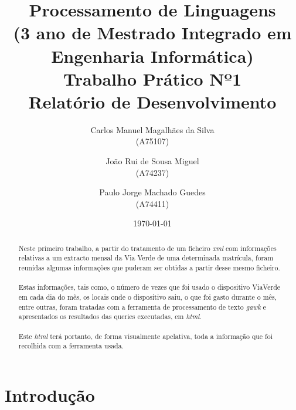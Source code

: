 \documentclass{report}
\title{Processamento de Linguagens\\(3 ano de Mestrado Integrado em Engenharia Informática)\\ \textbf{Trabalho Prático Nº1}\\ Relatório de Desenvolvimento}
\author{Carlos Manuel Magalhães da Silva\\ (A75107) \and
				João Rui de Sousa Miguel\\ (A74237) \and
				Paulo Jorge Machado Guedes\\ (A74411)}
\date{\today}
\begin{document}
\maketitle
\begin{abstract}
Neste primeiro trabalho, a partir do tratamento de um ficheiro \textit{xml} com informações relativas a um extracto mensal da Via Verde de uma determinada matrícula, foram reunidas algumas informações que puderam ser obtidas a partir desse mesmo ficheiro. \\\\
	Estas informações, tais como, o número de vezes que foi usado o dispositivo ViaVerde em cada dia do mês, os locais onde o dispositivo saiu, o que foi gasto durante o mês, entre outras, foram tratadas com a ferramenta de processamento de texto \textit{gawk} e apresentados os resultados das queries executadas, em \textit{html}. \\\\
	Este \textit{html} terá portanto, de forma visualmente apelativa, toda a informação que foi recolhida com a ferramenta usada. 
\end{abstract}
\tableofcontents





\chapter{Introdução} \label{intro}
\end{document}
